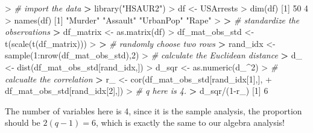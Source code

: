 \documentclass[
]{article}
\newenvironment{Shaded}{\begin{snugshade}}{\end{snugshade}}
\newcommand{\CommentTok}[1]{\textcolor[rgb]{0.56,0.35,0.01}{\textit{#1}}}
\newcommand{\DecValTok}[1]{\textcolor[rgb]{0.00,0.00,0.81}{#1}}
\newcommand{\ErrorTok}[1]{\textcolor[rgb]{0.64,0.00,0.00}{\textbf{#1}}}
\newcommand{\FunctionTok}[1]{\textcolor[rgb]{0.00,0.00,0.00}{#1}}
\newcommand{\NormalTok}[1]{#1}
\newcommand{\OtherTok}[1]{\textcolor[rgb]{0.56,0.35,0.01}{#1}}
\newcommand{\SpecialCharTok}[1]{\textcolor[rgb]{0.00,0.00,0.00}{#1}}
\newcommand{\StringTok}[1]{\textcolor[rgb]{0.31,0.60,0.02}{#1}}
\begin{document}
\begin{Shaded}
\begin{Highlighting}[]
\SpecialCharTok{\textgreater{}} \CommentTok{\# import the data}
\ErrorTok{\textgreater{}} \FunctionTok{library}\NormalTok{(}\StringTok{"HSAUR2"}\NormalTok{)}
\SpecialCharTok{\textgreater{}}\NormalTok{ df }\OtherTok{\textless{}{-}}\NormalTok{ USArrests}
\SpecialCharTok{\textgreater{}} \FunctionTok{dim}\NormalTok{(df)}
\NormalTok{[}\DecValTok{1}\NormalTok{] }\DecValTok{50}  \DecValTok{4}
\SpecialCharTok{\textgreater{}} \FunctionTok{names}\NormalTok{(df)}
\NormalTok{[}\DecValTok{1}\NormalTok{] }\StringTok{"Murder"}   \StringTok{"Assault"}  \StringTok{"UrbanPop"} \StringTok{"Rape"}    
\SpecialCharTok{\textgreater{}} 
\ErrorTok{\textgreater{}} \CommentTok{\# standardize the observations}
\ErrorTok{\textgreater{}}\NormalTok{ df\_matrix }\OtherTok{\textless{}{-}} \FunctionTok{as.matrix}\NormalTok{(df)}
\SpecialCharTok{\textgreater{}}\NormalTok{ df\_mat\_obs\_std }\OtherTok{\textless{}{-}} \FunctionTok{t}\NormalTok{(}\FunctionTok{scale}\NormalTok{(}\FunctionTok{t}\NormalTok{(df\_matrix)))}
\SpecialCharTok{\textgreater{}} 
\ErrorTok{\textgreater{}} \CommentTok{\# randomly choose two rows}
\ErrorTok{\textgreater{}}\NormalTok{ rand\_idx }\OtherTok{\textless{}{-}} \FunctionTok{sample}\NormalTok{(}\DecValTok{1}\SpecialCharTok{:}\FunctionTok{nrow}\NormalTok{(df\_mat\_obs\_std),}\DecValTok{2}\NormalTok{)}
\SpecialCharTok{\textgreater{}} \CommentTok{\# calculate the Euclidean distance}
\ErrorTok{\textgreater{}}\NormalTok{ d\_ }\OtherTok{\textless{}{-}} \FunctionTok{dist}\NormalTok{(df\_mat\_obs\_std[rand\_idx,])}
\SpecialCharTok{\textgreater{}}\NormalTok{ d\_sqr }\OtherTok{\textless{}{-}} \FunctionTok{as.numeric}\NormalTok{(d\_}\SpecialCharTok{\^{}}\DecValTok{2}\NormalTok{)}
\SpecialCharTok{\textgreater{}} \CommentTok{\# calcualte the correlation }
\ErrorTok{\textgreater{}}\NormalTok{ r\_ }\OtherTok{\textless{}{-}} \FunctionTok{cor}\NormalTok{(df\_mat\_obs\_std[rand\_idx[}\DecValTok{1}\NormalTok{],],}
\SpecialCharTok{+}\NormalTok{           df\_mat\_obs\_std[rand\_idx[}\DecValTok{2}\NormalTok{],])}
\SpecialCharTok{\textgreater{}} \CommentTok{\# q here is 4. }
\ErrorTok{\textgreater{}}\NormalTok{ d\_sqr}\SpecialCharTok{/}\NormalTok{(}\DecValTok{1}\SpecialCharTok{{-}}\NormalTok{r\_)}
\NormalTok{[}\DecValTok{1}\NormalTok{] }\DecValTok{6}
\end{Highlighting}
\end{Shaded}

The number of variables here is 4, since it is the sample analysis, the
proportion should be \(2(q-1)= 6\), which is exactly the same to our
algebra analysis!
\end{document}

